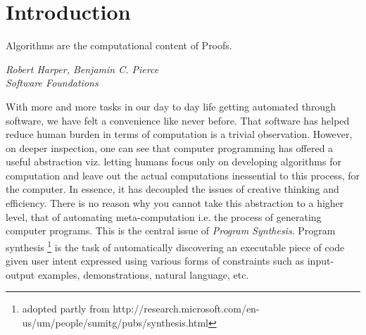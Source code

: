 \chapter{Introduction}

\epigraph{Algorithms are the computational content of Proofs.}{\textit{Robert Harper, Benjamin C. Pierce \\ Software Foundations}}

With more and more tasks in our day to day life getting automated through software, we have felt a convenience like never before. That software has helped reduce human burden in terms of computation is a trivial observation. However, on deeper inspection, one can see that computer programming has offered a useful abstraction viz. letting humans focus only on developing algorithms for computation and leave out the actual computations inessential to this process, for the computer. In essence, it has decoupled the issues of creative thinking and efficiency. There is no reason why you cannot take this abstraction to a higher level, that of automating meta-computation i.e. the process of generating computer programs. This is the central issue of \emph{Program Synthesis}. Program synthesis \footnote{adopted partly from http://research.microsoft.com/en-us/um/people/sumitg/pubs/synthesis.html} is the task of automatically discovering an executable piece of code given user intent expressed using various forms of constraints such as input-output examples, demonstrations, natural language, etc.

